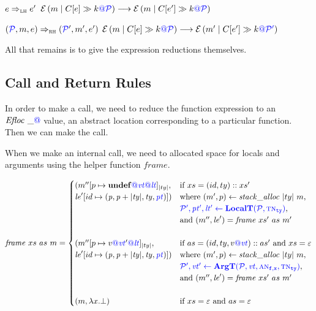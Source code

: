 \documentclass{llncs}
\begin{document}
\judgmenttwo{\(\ctx{\expr}_\lh\)}
            {\(\expr \Rightarrow_\lh \expr'\)}
            {\(\defestate{\ctx{\expr}} \longrightarrow \defestate{\ctx{\expr'}}\)}

\judgmenttwo{\(\ctx{\expr}_\rh\)}
            {\((\PCT, \mem, \expr) \Rightarrow_\rh (\PCT', \mem', \expr')\)}
            {\(\defestate{\ctx{\expr}} \longrightarrow \estate{\PCT'}{\mem'}{\ctx{\expr'}}{\cont}\)}
            
All that remains is to give the expression reductions themselves.

\expressions

\subsection{Call and Return Rules}

In order to make a call, we need to reduce the function expression to an \(\floc{\_}\) value, an
abstract location corresponding to a particular function. Then we can make the call.

\callexprstep

When we make an internal call, we need to allocated space for locals and arguments using the helper function
\(\mathit{frame}\).

\[\mathit{frame} ~ xs ~ as ~ \mem =
\begin{cases}
  (\mem''[p \mapsto \vundef\tagat\vt\tagat\lt]_{|ty|}, & \textnormal{if } xs = (id,ty)::xs' \\
  \lenv'[id \mapsto (\mathit{p, p+|ty|,ty,\pt})]) &
  \textnormal{where } (\mem',p) \leftarrow \mathit{stack\_alloc} ~ |ty| ~ \mem, \\
  & \trule{\localtres}{\localt}, \\
  & \textnormal{and } (\mem'',\lenv') = \mathit{frame} ~ xs' ~ as ~ m' \\ 
  \\
  (\mem''[p \mapsto v\tagat\vt'\tagat\lt]_{|ty|}, & \textnormal{if } as = (id,ty,v \tagat \vt)::as' \textnormal{ and } xs = \varepsilon \\
  \lenv'[id \mapsto (\mathit{p, p+|ty|,ty,\pt})]) &
  \textnormal{where } (\mem',p) \leftarrow \mathit{stack\_alloc} ~ |ty| ~ \mem, \\
  & \trule{\argtres}{\argt}, \\
  & \textnormal{and } (\mem'',\lenv') = \mathit{frame} ~ xs' ~ as ~ m' \\
  \\
  (\mem, \lambda x . \bot) & \textnormal{if } xs = \varepsilon \textnormal{ and } as = \varepsilon \\
\end{cases}\]
\end{document}
